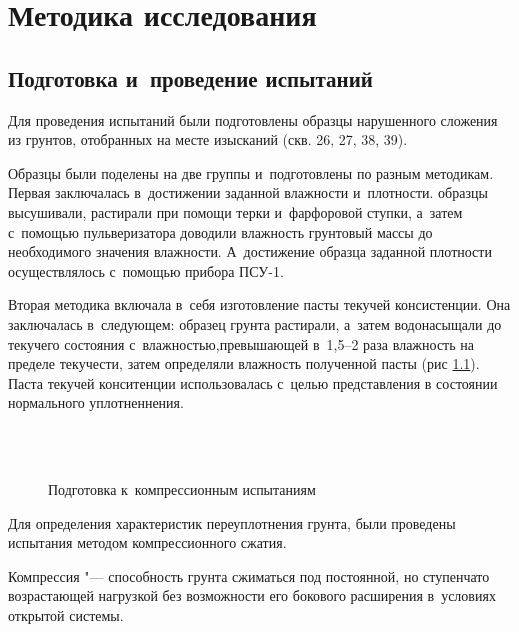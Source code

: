 \chapter{Методика исследования}

\section{Подготовка и~проведение испытаний}


Для проведения испытаний были подготовлены образцы нарушенного сложения из грунтов, отобранных на месте изысканий (скв. 26, 27, 38, 39).

 Образцы были поделены на две группы и~подготовлены по разным методикам.
 Первая заключалась в~достижении заданной влажности и~плотности. образцы высушивали, растирали при помощи терки и~фарфоровой ступки, а~затем с~помощью пульверизатора доводили влажность грунтовый массы до необходимого значения влажности. А~достижение образца заданной плотности осуществлялось с~помощью прибора ПСУ-1.

Вторая методика включала в~себя изготовление пасты текучей консистенции. Она заключалась в~следующем: образец грунта растирали, а~затем водонасыщали до текучего состояния с~влажностью,превышающей в~1,5--2 раза влажность на пределе текучести, затем определяли влажность полученной пасты (рис \ref{eq:pst}). 
Паста текучей конситенции использовалась с~целью представления в состоянии нормального уплотненнения.


\begin{figure}[ht]
  {\centering
       \hfill
      \\
      \\
  }
  \caption{Подготовка к~компрессионным испытаниям}
  \label{eq:pst}
\end{figure}

Для определения характеристик переуплотнения грунта, были проведены испытания методом компрессионного сжатия. 

Компрессия "--- способность грунта сжиматься под постоянной, но ступенчато возрастающей нагрузкой без возможности его бокового расширения в~условиях открытой системы.

